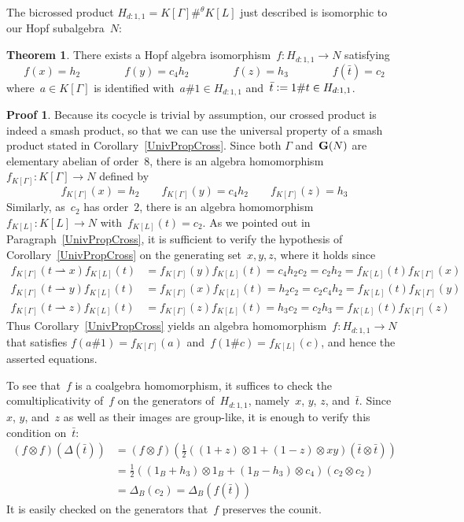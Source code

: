 \documentclass{article}
\numberwithin{equation}{section}
\theoremstyle{definition}
\newtheorem*{pf}{Proof}
\newtheorem*{thm}{Theorem}
\theoremstyle{break}
\newcommand{\ot}{\mathbin{\otimes}}
\newcommand{\deq}{\vcentcolon =}
\newcommand{\1}{{(1)}}
\newcommand{\2}{{(2)}}
\newcommand{\3}{{(3)}}
\newcommand{\ra}{\rightarrow}
\newcommand{\db}{\Delta_{B}}
\newcommand{\B}{1_B}
\begin{document}
The bicrossed product $H_{d:1,1} = K[\Gamma] \#^{\theta} K[L]$ just described is isomorphic to our Hopf subalgebra~$N$:
\begin{thm}
There exists a Hopf algebra isomorphism~$f \colon H_{d:1,1} \ra N$ satisfying
\begin{equation*} \label{isoHdN}
f(x) = h_2 \qquad \qquad
f(y) = c_4 h_2 \qquad \qquad
f(z) = h_3 \qquad \qquad
f(\bar t) = c_2
\end{equation*}
where~$a\in K[\Gamma ]$ is identified with~$a\# 1\in H_{d:1,1}$
and~$\bar{t} \deq 1 \# t \in H_{d:1,1}$.
\end{thm}
\begin{pf}
Because its cocycle is trivial by assumption, our crossed product is indeed a smash product, so that we can use the universal property of a smash product stated in Corollary~\ref{UnivPropCross}. Since both $\Gamma$ and~${\bf G}(N)$ are elementary abelian of order~$8$, there is an algebra homomorphism~$f_{K[\Gamma]} \colon K[\Gamma] \ra N$ defined by
\begin{equation*}
f_{K[\Gamma]}(x) = h_2 \qquad
f_{K[\Gamma]}(y) = c_4 h_2 \qquad
f_{K[\Gamma]}(z) = h_3
\end{equation*}
Similarly, as~$c_2$ has order~$2$, there is an algebra
homomorphism~\mbox{$f_{K[L]} \colon K[L] \ra N$} with~\mbox{$f_{K[L]} (t) = c_2$}. As we pointed out in Paragraph~\ref{UnivPropCross}, it is sufficient to verify the hypothesis of Corollary~\ref{UnivPropCross} on the generating set~$x,y,z$, where it holds since
\begin{align*}
f_{K[\Gamma]}(t \rightharpoonup x ) f_{K[L]}(t) & =f_{K[\Gamma]}(y)f_{K[L]}(t) = c_4 h_2 c_2 = c_2h_2 = f_{K[L]}(t) f_{K[\Gamma]}(x)\\
f_{K[\Gamma]}(t \rightharpoonup y )f_{K[L]}(t) &= f_{K[\Gamma]}(x)f_{K[L]}(t) = h_2 c_2 =
c_2 c_4 h_2 =  f_{K[L]}(t) f_{K[\Gamma]}(y)\\
f_{K[\Gamma]}(t \rightharpoonup z ) f_{K[L]}(t) &= f_{K[\Gamma]}(z) f_{K[L]}(t) = h_3 c_2 = c_2 h_3 = f_{K[L]}(t) f_{K[\Gamma]}(z)
\end{align*}
Thus Corollary~\ref{UnivPropCross} yields an algebra homomorphism~$f \colon H_{d:1,1} \to N$ that satisfies $f(a \# 1) = f_{K[\Gamma ]}(a)$ and~$f(1 \# c) = f_{K[L]}(c)$, and hence the asserted equations.

To see that~$f$ is a coalgebra homomorphism, it suffices to check the comultiplicativity of~$f$ on the generators of~$H_{d:1,1}$, namely~$x$, $y$, $z$, and~$\bar t$. Since~$x$, $y$, and~$z$ as well as their images are group-like, it is enough to verify this condition on~$\bar t$:
\begin{align*}
\left( f \ot f \right) \left(\Delta (\bar{t}) \right)
&= \left( f \ot f \right) \left(\frac{1}{2} \left( (1+z) \ot 1 + (1-z) \ot xy \right) \left(\bar{t} \ot \bar{t} \right) \right) \\
&=\frac{1}{2} \left( (\B + h_3) \ot \B  + (\B - h_3) \ot c_4 \right) \left(c_2 \ot c_2\right) \\
&= \db(c_2) = \db(f(\bar{t}))
\end{align*}
It is easily checked on the generators that~$f$ preserves the counit.


\end{pf}
\end{document}
